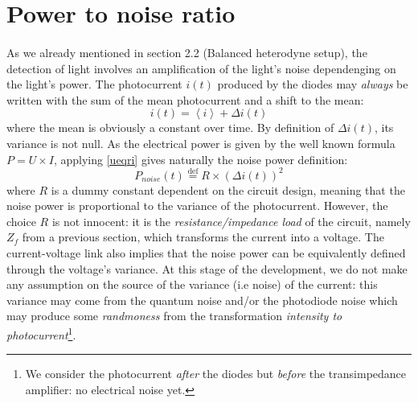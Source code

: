 \documentclass[12pt]{report}
\begin{document}
\section{Power to noise ratio}
\paragraph{}

As we already mentioned in section 2.2 (Balanced heterodyne setup), the detection of light involves an amplification of the light's noise dependenging on the light's power. The photocurrent $i(t)$ produced by the diodes may \textit{always} be written with the sum of the mean photocurrent and a shift to the mean:
\begin{equation}
\label{i_split_delta_i}
i(t) = \left\langle i \right\rangle + \Delta i(t)
\end{equation}
where the mean is obviously a constant over time. By definition of $\Delta i(t)$, its variance is not null. As the electrical power is given by the well known formula $P = U \times I$, applying \eqref{ueqri} gives naturally the noise power definition:
\begin{equation}
\label{def_p_noise}
P_{noise}(t) \stackrel{\text{def}}{=} R \times (\Delta i(t))^2 
\end{equation}
where $R$ is a dummy constant dependent on the circuit design, meaning that the noise power is proportional to the variance of the photocurrent. However, the choice $R$ is not innocent: it is the \textit{resistance/impedance load} of the circuit, namely $Z_f$ from a previous section, which transforms the current into a voltage. The current-voltage link also implies that the noise power can be equivalently defined through the voltage's variance. At this stage of the development, we do not make any assumption on the source of the variance (i.e noise) of the current: this variance may come from the quantum noise and/or the photodiode noise which may produce some \textit{randmoness} from the transformation \textit{intensity to photocurrent}\footnote{We consider the photocurrent \textit{after} the diodes but \textit{before} the transimpedance amplifier: no electrical noise yet.}.
\end{document}
